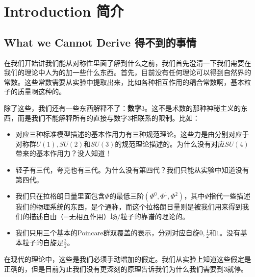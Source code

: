 


\chapter{Introduction 简介}\label{chap1}

\section{What we Cannot Derive 得不到的事情}

在我们开始讲我们能从对称性里面了解到什么之前，我们首先澄清一下我们需要在我们的理论中人为的加一些什么东西。首先，目前没有任何理论可以得到自然界的常数。这些常数需要从实验中提取出来，比如各种相互作用的耦合常数啊，基本粒子的质量啊这种的。

除了这些，我们还有一些东西解释不了：{\bf 数字$3$}。这不是术数的那种神秘主义的东西，而是我们不能解释所有的直接与数字$3$相联系的限制。比如：

\begin{itemize}
\item 对应三种标准模型描述的基本作用力有三种规范理论。这些力是由分别对应于对称群$U(1), SU(2)$和$SU(3)$的规范理论描述的。为什么没有对应$SU(4)$带来的基本作用力？没人知道！
\item 轻子有三代，夸克也有三代。为什么没有第四代？我们只能从实验中知道没有第四代。
\item 我们只在拉格朗日量里面包含$\Phi$的最低三阶$(\Phi^0, \Phi^1, \Phi^2)$，其中$\Phi$指代一些描述我们的物理系统的东西，是个通称，而这个拉格朗日量则是被我们用来得到我们的描述自由（=无相互作用）场/粒子的靠谱的理论的。
\item 我们只用三个基本的Poincare群双覆盖的表示，分别对应自旋$0, \tfrac{1}{2}$和$1$。没有基本粒子的自旋是$\tfrac{3}{2}$。
\end{itemize}

在现代的理论中，这些是我们必须手动增加的假定。我们从实验上知道这些假定是正确的，但是目前为止我们没有更深刻的原理告诉我们为什么我们需要到$3$就停。

